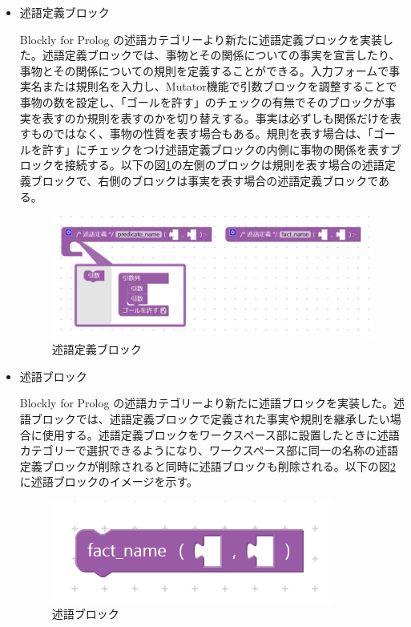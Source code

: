 \documentclass{risepaper}
\begin{document}
\begin{itemize}   

\item 述語定義ブロック

Blockly for Prolog の述語カテゴリーより新たに述語定義ブロックを実装した。述語定義ブロックでは、事物とその関係についての事実を宣言したり、事物とその関係についての規則を定義することができる。入力フォームで事実名または規則名を入力し、Mutator機能で引数ブロックを調整することで事物の数を設定し、「ゴールを許す」のチェックの有無でそのブロックが事実を表すのか規則を表すのかを切り替えする。事実は必ずしも関係だけを表すものではなく、事物の性質を表す場合もある。規則を表す場合は、「ゴールを許す」にチェックをつけ述語定義ブロックの内側に事物の関係を表すブロックを接続する。以下の図\ref{fig:prolog_predicate_definition}の左側のブロックは規則を表す場合の述語定義ブロックで、右側のブロックは事実を表す場合の述語定義ブロックである。

\begin{figure}[h]
\begin{center}
\includegraphics[scale=0.5]{img/prolog_predicate_definition.PNG}
\caption{述語定義ブロック}%
\label{fig:prolog_predicate_definition}
\end{center}%
\end{figure}%

\item 述語ブロック

Blockly for Prolog の述語カテゴリーより新たに述語ブロックを実装した。述語ブロックでは、述語定義ブロックで定義された事実や規則を継承したい場合に使用する。述語定義ブロックをワークスペース部に設置したときに述語カテゴリーで選択できるようになり、ワークスペース部に同一の名称の述語定義ブロックが削除されると同時に述語ブロックも削除される。以下の図\ref{fig:prolog_predicate}に述語ブロックのイメージを示す。

\begin{figure}[h]
\begin{center}
\includegraphics[scale=0.8]{img/prolog_predicate.PNG}
\caption{述語ブロック}%
\label{fig:prolog_predicate}
\end{center}%
\end{figure}%


\end{itemize}
\end{document}
